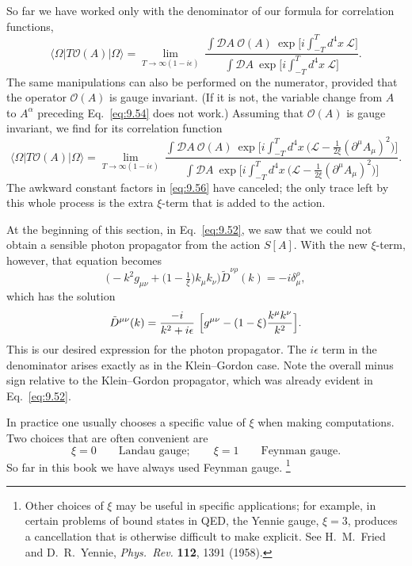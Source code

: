 So far we have worked only with the denominator of our formula for correlation
functions,
\begin{equation}
  \langle\Omega|T\mathcal{O}(A)|\Omega\rangle
  = \lim_{T\to\infty(1-i\epsilon)}\
    \frac{\int\mathcal{D}A\ \mathcal{O}(A)\ \exp\bigl[
      i\int_{-T}^{T}d^4x\ \mathcal{L} \bigr]}
      {\int\mathcal{D}A\ \exp\bigl[ i\int_{-T}^{T}d^4x\ \mathcal{L} \bigr]} .
\end{equation}
The same manipulations can also be performed on the numerator, provided that
the operator $\mathcal{O}(A)$ is gauge invariant.  (If it is not, the variable
change from $A$ to $A^\alpha$ preceding Eq.~\eqref{eq:9.54} does not work.)
Assuming that $\mathcal{O}(A)$ is gauge invariant, we find for its correlation
function
\begin{equation}
  \langle\Omega|T\mathcal{O}(A)|\Omega\rangle
  = \lim_{T\to\infty(1-i\epsilon)}\
    \frac{\int\mathcal{D}A\ \mathcal{O}(A)\ \exp\bigl[ i\int_{-T}^{T}d^4x\
      \bigl( \mathcal{L} - \frac{1}{2\xi}(\partial^\mu A_\mu)^2 \bigr)
      \bigr]}
      {\int\mathcal{D}A\ \exp\bigl[ i\int_{-T}^{T}d^4x\
        \bigl( \mathcal{L} - \frac{1}{2\xi}(\partial^\mu A_\mu)^2 \bigr)
        \bigr]} .
  \label{eq:9.57}
\end{equation}
The awkward constant factors in \eqref{eq:9.56} have canceled; the only trace
left by this whole process is the extra $\xi$-term that is added to the
action.

At the beginning of this section, in Eq.~\eqref{eq:9.52}, we saw that we
could not obtain a sensible photon propagator from the action $S[A]$.  With
the new $\xi$-term, however, that equation becomes
\begin{equation}
  \bigl( -k^2 g_{\mu\nu} + \bigl( 1 - \tfrac{1}{\xi} \bigr)k_\mu k_\nu \bigr)
    \tilde{D}^{\nu\rho}(k) = -i\delta^\rho_\mu ,
\end{equation}
which has the solution
\begin{equation}
  \tilde{D}^{\mu\nu}(k) = \frac{-i}{k^2+i\epsilon}\ \Bigl[
    g^{\mu\nu} - (1-\xi)\frac{k^\mu k^\nu}{k^2} \Bigr] .
  \label{eq:9.58}
\end{equation}
This is our desired expression for the photon propagator.  The $i\epsilon$
term in the denominator arises exactly as in the Klein--Gordon case.  Note the
overall minus sign relative to the Klein--Gordon propagator, which was already
evident in Eq.~\eqref{eq:9.52}.

In practice one usually chooses a specific value of $\xi$ when making
computations.  Two choices that are often convenient are
\begin{equation}
  \xi = 0 \qquad \text{Landau gauge};\qquad
  \xi = 1 \qquad \text{Feynman gauge} .
\end{equation}
So far in this book we have always used Feynman gauge.%
\footnote{Other choices of $\xi$ may be useful in specific applications; for
example, in certain problems of bound states in QED, the Yennie gauge,
$\xi = 3$, produces a cancellation that is otherwise difficult to make
explicit.  See H.~M.~Fried and D.~R.~Yennie, \emph{Phys.\ Rev.} \textbf{112},
1391 (1958).}

